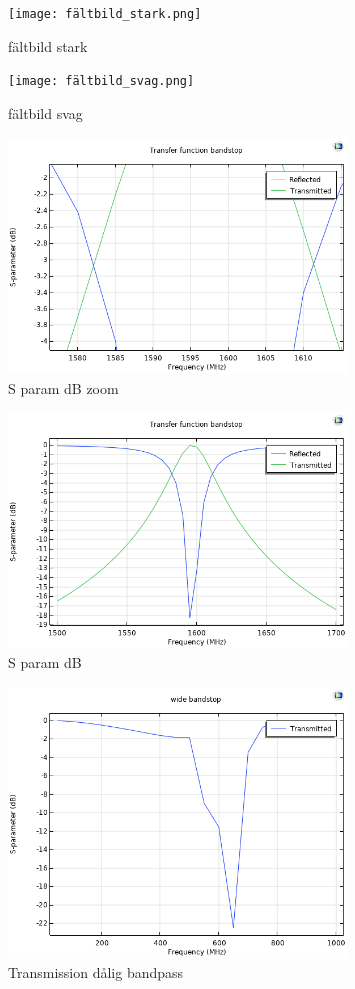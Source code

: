 \documentclass[a4paper]{article}
\begin{document}
\begin{figure}[h]
	\centering
	\texttt{[image: fältbild\_stark.png]}
	\caption{fältbild stark}
	\label{fig:stark}
\end{figure}

\begin{figure}[h]
	\centering
	\texttt{[image: fältbild\_svag.png]}
	\caption{fältbild svag}
	\label{fig:svag}
\end{figure}

\begin{figure}[h]
	\centering
	\includegraphics[width=0.8\textwidth]{reflect_transmit_dB_zoom.png}
	\caption{S param dB zoom}
	\label{fig:rtzoom}
\end{figure}

\begin{figure}[h]
	\centering
	\includegraphics[width=0.8\textwidth]{reflect_transmit_dB.png}
	\caption{S param dB}
	\label{fig:rt}
\end{figure}

\begin{figure}[h]
	\centering
	\includegraphics[width=0.8\textwidth]{bandstopbred.png}
	\caption{Transmission dålig bandpass}
	\label{fig:bandpass}
\end{figure}
	
\end{document}
